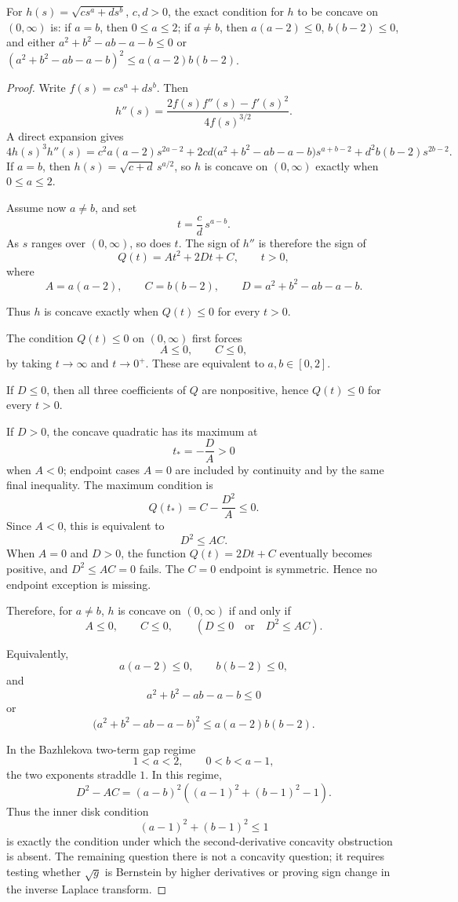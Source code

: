 \begin{lemma}
\label{res:sqrt-two-term-symbol-exact-concavity-criterion}
For \(h(s)=\sqrt{c s^a+d s^b}\), \(c,d>0\), the exact condition for \(h\) to be concave on \((0,\infty)\) is: if \(a=b\), then \(0\le a\le2\); if \(a\ne b\), then \(a(a-2)\le0\), \(b(b-2)\le0\), and either \(a^2+b^2-ab-a-b\le0\) or \((a^2+b^2-ab-a-b)^2\le a(a-2)b(b-2)\).
\end{lemma}
\begin{proof}
Write \(f(s)=c s^a+d s^b\). Then
\[
h''(s)=\frac{2f(s)f''(s)-f'(s)^2}{4f(s)^{3/2}}.
\]
A direct expansion gives
\[
4h(s)^3h''(s)
=c^2 a(a-2)s^{2a-2}
+2cd\bigl(a^2+b^2-ab-a-b\bigr)s^{a+b-2}
+d^2b(b-2)s^{2b-2}.
\]
If \(a=b\), then \(h(s)=\sqrt{c+d}\,s^{a/2}\), so \(h\) is concave on \((0,\infty)\) exactly when \(0\le a\le2\).

Assume now \(a\ne b\), and set
\[
t=\frac cd\,s^{a-b}.
\]
As \(s\) ranges over \((0,\infty)\), so does \(t\). The sign of \(h''\) is therefore the sign of
\[
Q(t)=A t^2+2D t+C,\qquad t>0,
\]
where
\[
A=a(a-2),\qquad C=b(b-2),\qquad D=a^2+b^2-ab-a-b.
\]

Thus \(h\) is concave exactly when \(Q(t)\le0\) for every \(t>0\).

The condition \(Q(t)\le0\) on \((0,\infty)\) first forces
\[
A\le0,\qquad C\le0,
\]
by taking \(t\to\infty\) and \(t\to0^+\). These are equivalent to \(a,b\in[0,2]\).

If \(D\le0\), then all three coefficients of \(Q\) are nonpositive, hence \(Q(t)\le0\) for every \(t>0\).

If \(D>0\), the concave quadratic has its maximum at
\[
t_*=-\frac DA>0
\]
when \(A<0\); endpoint cases \(A=0\) are included by continuity and by the same final inequality. The maximum condition is
\[
Q(t_*)=C-\frac{D^2}{A}\le0.
\]
Since \(A<0\), this is equivalent to
\[
D^2\le AC.
\]
When \(A=0\) and \(D>0\), the function \(Q(t)=2Dt+C\) eventually becomes positive, and \(D^2\le AC=0\) fails. The \(C=0\) endpoint is symmetric. Hence no endpoint exception is missing.

Therefore, for \(a\ne b\), \(h\) is concave on \((0,\infty)\) if and only if
\[
A\le0,\qquad C\le0,\qquad
\left(D\le0\quad\text{or}\quad D^2\le AC\right).
\]

Equivalently,
\[
a(a-2)\le0,\qquad b(b-2)\le0,
\]
and
\[
a^2+b^2-ab-a-b\le0
\]
or
\[
\bigl(a^2+b^2-ab-a-b\bigr)^2
\le a(a-2)b(b-2).
\]

In the Bazhlekova two-term gap regime
\[
1<a<2,\qquad 0<b<a-1,
\]
the two exponents straddle \(1\). In this regime,
\[
D^2-AC=(a-b)^2\left((a-1)^2+(b-1)^2-1\right).
\]
Thus the inner disk condition
\[
(a-1)^2+(b-1)^2\le1
\]
is exactly the condition under which the second-derivative concavity obstruction is absent. The remaining question there is not a concavity question; it requires testing whether \(\sqrt g\) is Bernstein by higher derivatives or proving sign change in the inverse Laplace transform.
\end{proof}

